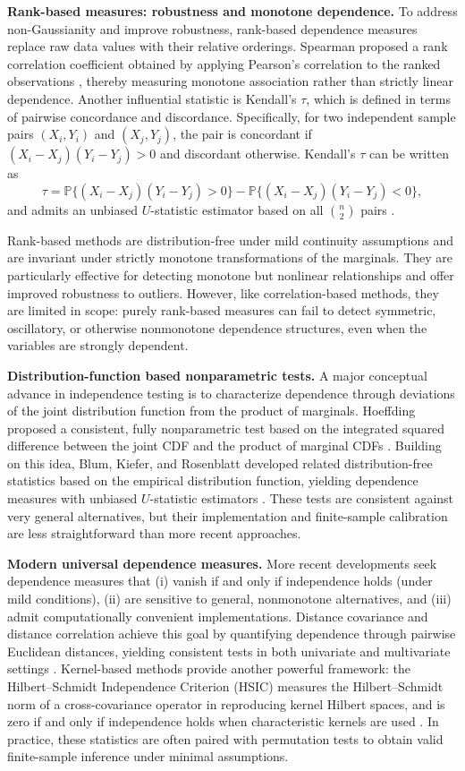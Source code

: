 \documentclass[12pt,reqno,oneside]{amsbook}
\theoremstyle{definition}
\theoremstyle{remark}
\begin{document}
\textbf{Rank-based measures: robustness and monotone dependence.}
To address non-Gaussianity and improve robustness,
rank-based dependence measures replace raw data values with their relative orderings.
Spearman proposed a rank correlation coefficient obtained by applying Pearson’s correlation
to the ranked observations \citep{Spearman1904},
thereby measuring monotone association rather than strictly linear dependence.
Another influential statistic is Kendall’s $\tau$,
which is defined in terms of pairwise concordance and discordance.
Specifically, for two independent sample pairs $(X_i,Y_i)$ and $(X_j,Y_j)$,
the pair is concordant if $(X_i-X_j)(Y_i-Y_j)>0$ and discordant otherwise.
Kendall’s $\tau$ can be written as
\[
\tau
=
\mathbb{P}\{(X_i-X_j)(Y_i-Y_j)>0\}
-
\mathbb{P}\{(X_i-X_j)(Y_i-Y_j)<0\},
\]
and admits an unbiased $U$-statistic estimator based on all $\binom{n}{2}$ pairs
\citep{Kendall1938}.

Rank-based methods are distribution-free under mild continuity assumptions
and are invariant under strictly monotone transformations of the marginals.
They are particularly effective for detecting monotone but nonlinear relationships
and offer improved robustness to outliers.
However, like correlation-based methods, they are limited in scope:
purely rank-based measures can fail to detect symmetric, oscillatory,
or otherwise nonmonotone dependence structures,
even when the variables are strongly dependent.

\textbf{Distribution-function based nonparametric tests.}
A major conceptual advance in independence testing is to characterize dependence
through deviations of the joint distribution function from the product of marginals.
Hoeffding proposed a consistent, fully nonparametric test based on the integrated squared
difference between the joint CDF and the product of marginal CDFs \citep{Hoeffding1948}.
Building on this idea, Blum, Kiefer, and Rosenblatt developed related distribution-free
statistics based on the empirical distribution function,
yielding dependence measures with unbiased $U$-statistic estimators
\citep{BlumKieferRosenblatt1961}.
These tests are consistent against very general alternatives,
but their implementation and finite-sample calibration
are less straightforward than more recent approaches.

\textbf{Modern universal dependence measures.}
More recent developments seek dependence measures that
(i) vanish if and only if independence holds (under mild conditions),
(ii) are sensitive to general, nonmonotone alternatives,
and (iii) admit computationally convenient implementations.
Distance covariance and distance correlation achieve this goal
by quantifying dependence through pairwise Euclidean distances,
yielding consistent tests in both univariate and multivariate settings
\citep{SzekelyRizzoBakirov2007}.
Kernel-based methods provide another powerful framework:
the Hilbert--Schmidt Independence Criterion (HSIC)
measures the Hilbert--Schmidt norm of a cross-covariance operator in reproducing kernel Hilbert spaces,
and is zero if and only if independence holds when characteristic kernels are used
\citep{Gretton2005HSIC}.
In practice, these statistics are often paired with permutation tests
to obtain valid finite-sample inference under minimal assumptions.
\end{document}
